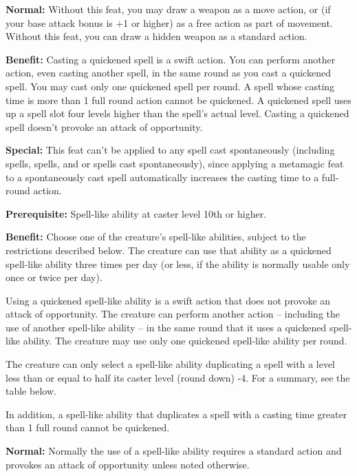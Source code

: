 \textbf{Normal:} Without this feat, you may draw a weapon as a move action, or 
(if your base attack bonus is +1 or higher) as a free action as part of movement. 
Without this feat, you can draw a hidden weapon as a standard action.


\textbf{Benefit:} Casting a quickened spell is a swift action. You can perform another 
action, even casting another spell, in the same round as you cast a quickened spell. 
You may cast only one quickened spell per round. A spell whose casting time is 
more than 1 full round action cannot be quickened. A quickened spell uses up a 
spell slot four levels higher than the spell's actual level. Casting a quickened 
spell doesn't provoke an attack of opportunity.

\textbf{Special:} This feat can't be applied to any spell cast spontaneously (including 
 spells,  spells, and  or  spells cast spontaneously), since 
applying a metamagic feat to a spontaneously cast spell automatically increases 
the casting time to a full-round action.


\textbf{Prerequisite:} Spell-like ability at caster level 10th or higher.

\textbf{Benefit:} Choose one of the creature's spell-like abilities, subject to 
the restrictions described below. The creature can use that ability as a quickened 
spell-like ability three times per day (or less, if the ability is normally usable 
only once or twice per day).

Using a quickened spell-like ability is a swift action that does not provoke an 
attack of opportunity. The creature can perform another action -- including the 
use of another spell-like ability -- in the same round that it uses a quickened 
spell-like ability. The creature may use only one quickened spell-like ability 
per round.

The creature can only select a spell-like ability duplicating a spell with a level 
less than or equal to half its caster level (round down) -4. For a summary, see 
the table below.

In addition, a spell-like ability that duplicates a spell with a casting time greater 
than 1 full round cannot be quickened.

\textbf{Normal:} Normally the use of a spell-like ability requires a standard action 
and provokes an attack of opportunity unless noted otherwise.

